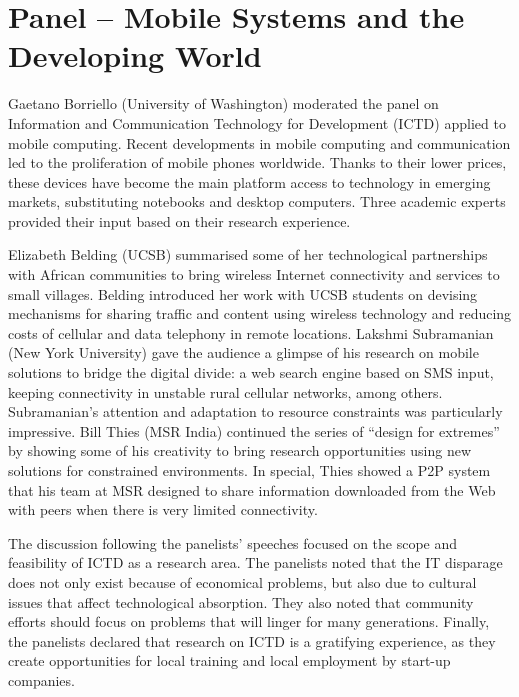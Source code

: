 \section{Panel -- Mobile Systems and the Developing World}
\label{sec:panel}

Gaetano Borriello (University of Washington) moderated the panel on
Information and Communication Technology for Development (ICTD) applied
to mobile computing. Recent developments in mobile computing and
communication led to the proliferation of mobile phones worldwide.
Thanks to their lower prices, these devices have become the main
platform access to technology in emerging markets, substituting
notebooks and desktop computers. Three academic experts provided their
input based on their research experience.

Elizabeth Belding (UCSB) summarised some of her technological
partnerships with African communities to bring wireless Internet
connectivity and services to small villages. Belding introduced her work
with UCSB students on devising mechanisms for sharing traffic and
content using wireless technology and reducing costs of cellular and
data telephony in remote locations. Lakshmi Subramanian (New York
University) gave the audience a glimpse of his research on mobile
solutions to bridge the digital divide: a web search engine based on SMS
input, keeping connectivity in unstable rural cellular networks, among
others. Subramanian's attention and adaptation to
resource constraints was particularly impressive.
Bill Thies (MSR India) continued the series of
``design for extremes'' by showing some of his creativity to bring
research opportunities using new solutions for constrained environments.
In special, Thies showed a P2P system that his team at MSR designed to
share information downloaded from the Web with peers when there is very
limited connectivity.

The discussion following the panelists' speeches focused on the scope
and feasibility of ICTD as a research area. The panelists noted that the
IT disparage does not only exist because of economical problems, but
also due to cultural issues that affect technological absorption. They
also noted that community efforts should focus on problems that will
linger for many generations. Finally, the panelists declared that
research on ICTD is a gratifying experience, as they create
opportunities for local training and local employment by start-up
companies.
